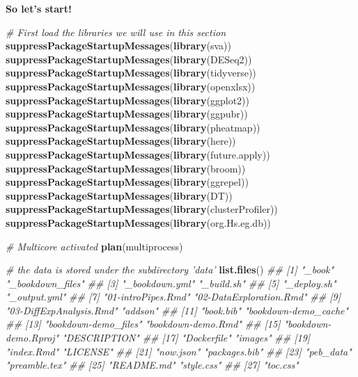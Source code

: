 \documentclass[]{book}
\newenvironment{Shaded}{\begin{snugshade}}{\end{snugshade}}
\newcommand{\CommentTok}[1]{\textcolor[rgb]{0.56,0.35,0.01}{\textit{#1}}}
\newcommand{\KeywordTok}[1]{\textcolor[rgb]{0.13,0.29,0.53}{\textbf{#1}}}
\newcommand{\NormalTok}[1]{#1}
\begin{document}
\textbf{So let's start!}

\begin{Shaded}
\begin{Highlighting}[]

\CommentTok{# First load the libraries we will use in this section}
\KeywordTok{suppressPackageStartupMessages}\NormalTok{(}\KeywordTok{library}\NormalTok{(sva))}
\KeywordTok{suppressPackageStartupMessages}\NormalTok{(}\KeywordTok{library}\NormalTok{(DESeq2))}
\KeywordTok{suppressPackageStartupMessages}\NormalTok{(}\KeywordTok{library}\NormalTok{(tidyverse))}
\KeywordTok{suppressPackageStartupMessages}\NormalTok{(}\KeywordTok{library}\NormalTok{(openxlsx))}
\KeywordTok{suppressPackageStartupMessages}\NormalTok{(}\KeywordTok{library}\NormalTok{(ggplot2))}
\KeywordTok{suppressPackageStartupMessages}\NormalTok{(}\KeywordTok{library}\NormalTok{(ggpubr))}
\KeywordTok{suppressPackageStartupMessages}\NormalTok{(}\KeywordTok{library}\NormalTok{(pheatmap))}
\KeywordTok{suppressPackageStartupMessages}\NormalTok{(}\KeywordTok{library}\NormalTok{(here))}
\KeywordTok{suppressPackageStartupMessages}\NormalTok{(}\KeywordTok{library}\NormalTok{(future.apply))}
\KeywordTok{suppressPackageStartupMessages}\NormalTok{(}\KeywordTok{library}\NormalTok{(broom))}
\KeywordTok{suppressPackageStartupMessages}\NormalTok{(}\KeywordTok{library}\NormalTok{(ggrepel))}
\KeywordTok{suppressPackageStartupMessages}\NormalTok{(}\KeywordTok{library}\NormalTok{(DT))}
\KeywordTok{suppressPackageStartupMessages}\NormalTok{(}\KeywordTok{library}\NormalTok{(clusterProfiler))}
\KeywordTok{suppressPackageStartupMessages}\NormalTok{(}\KeywordTok{library}\NormalTok{(org.Hs.eg.db))}

\CommentTok{# Multicore activated}
\KeywordTok{plan}\NormalTok{(multiprocess)}

\CommentTok{# the data is stored under the subdirectory 'data'}
\KeywordTok{list.files}\NormalTok{()}
\CommentTok{##  [1] "_book"                  "_bookdown_files"       }
\CommentTok{##  [3] "_bookdown.yml"          "_build.sh"             }
\CommentTok{##  [5] "_deploy.sh"             "_output.yml"           }
\CommentTok{##  [7] "01-introPipes.Rmd"      "02-DataExploration.Rmd"}
\CommentTok{##  [9] "03-DiffExpAnalysis.Rmd" "addson"                }
\CommentTok{## [11] "book.bib"               "bookdown-demo_cache"   }
\CommentTok{## [13] "bookdown-demo_files"    "bookdown-demo.Rmd"     }
\CommentTok{## [15] "bookdown-demo.Rproj"    "DESCRIPTION"           }
\CommentTok{## [17] "Dockerfile"             "images"                }
\CommentTok{## [19] "index.Rmd"              "LICENSE"               }
\CommentTok{## [21] "now.json"               "packages.bib"          }
\CommentTok{## [23] "peb_data"               "preamble.tex"          }
\CommentTok{## [25] "README.md"              "style.css"             }
\CommentTok{## [27] "toc.css"}


\end{Highlighting}
\end{Shaded}
\end{document}
